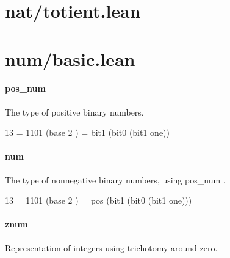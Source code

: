 \documentclass{article}
\begin{document}
\section{nat/totient.lean}\section{num/basic.lean}\paragraph{pos\_num}
\par
The type of positive binary numbers.
\\
\colorbox[RGB]{253,246,227}{\parbox{4.5in}{{{{\color[RGB]{108, 113, 196} 13 }}}{{{\color[RGB]{101, 123, 131}   }}}{{{\color[RGB]{181, 137, 0} = }}}{{{\color[RGB]{101, 123, 131}   }}}{{{\color[RGB]{108, 113, 196} 1101 }}}{{{\color[RGB]{101, 123, 131} (base  }}}{{{\color[RGB]{108, 113, 196} 2 }}}{{{\color[RGB]{101, 123, 131} )  }}}{{{\color[RGB]{181, 137, 0} = }}}{{{\color[RGB]{101, 123, 131}  bit1 (bit0 (bit1 one)) }}}\\

}}\paragraph{num}
\par
The type of nonnegative binary numbers, using 
\colorbox[RGB]{253,246,227}{{{{\color[RGB]{101, 123, 131} pos\_num }}}}.
\\
\colorbox[RGB]{253,246,227}{\parbox{4.5in}{{{{\color[RGB]{108, 113, 196} 13 }}}{{{\color[RGB]{101, 123, 131}   }}}{{{\color[RGB]{181, 137, 0} = }}}{{{\color[RGB]{101, 123, 131}   }}}{{{\color[RGB]{108, 113, 196} 1101 }}}{{{\color[RGB]{101, 123, 131} (base  }}}{{{\color[RGB]{108, 113, 196} 2 }}}{{{\color[RGB]{101, 123, 131} )  }}}{{{\color[RGB]{181, 137, 0} = }}}{{{\color[RGB]{101, 123, 131}  pos (bit1 (bit0 (bit1 one))) }}}\\

}}\paragraph{znum}
\par
Representation of integers using trichotomy around zero.
\\
\end{document}
